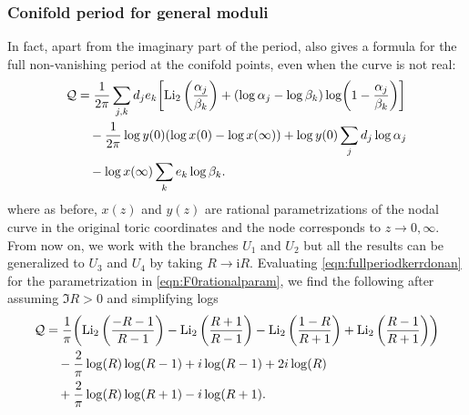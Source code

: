 \documentclass[11pt, a4paper]{article}
\newcommand{\ii}{\mathrm{i}}
\newcommand{\Li}{\operatorname{Li}}
\numberwithin{equation}{section}
\begin{document}
\subsubsection{Conifold period for general moduli}
In fact, apart from the imaginary part of the period, \cite[eq. (4.12)]{kerr2008} also gives a formula for the full non-vanishing period at the conifold points, even when the curve is not real:
\begin{equation}\label{eqn:fullperiodkerrdonan}
\begin{aligned}
  \mathcal{Q} &= \frac{1}{2\pi} \sum_{j, k} d_j e_k \qty[ \Li_2\qty(\frac{\alpha_j}{\beta_k}) + \qty(\log \alpha_j - \log \beta_k) \log(1 - \frac{\alpha_j}{\beta_k}) ] \\
  &\quad -\frac{1}{2\pi} \log y(0) \qty(\log x(0) - \log x(\infty))
  + \log y(0) \sum_j d_j \log \alpha_j \\
  &\quad - \log x(\infty) \sum_k e_k \log \beta_k.
\end{aligned}
\end{equation}
where as before, $x(z)$ and $y(z)$ are rational parametrizations of the nodal curve in the original toric coordinates and the node corresponds to $z \to 0, \infty$.
From now on, we work with the branches $U_1$ and $U_2$ but all the results can be generalized to $U_3$ and $U_4$ by taking $R \to \ii R$.
Evaluating \cref{eqn:fullperiodkerrdonan} for the parametrization in \cref{eqn:F0rationalparam}, we find the following after assuming $\Im R > 0$ and simplifying logs
\begin{equation}
  \begin{aligned}
    \mathcal{Q} &= \frac{1}{\pi} \qty(\Li_2\left(\frac{-R-1}{R-1}\right)-\Li_2\left(\frac{R+1}{R-1}\right)-\Li_2\left(\frac{1-R}{R+1}\right)+\Li_2\left(\frac{R-1}{R+1}\right)) \\
    &\quad -\frac{2}{\pi} \log (R) \log (R-1)+i  \log (R-1)+2 i  \log (R)\\
    &\quad +\frac{2}{\pi} \log (R) \log (R+1)-i  \log (R+1).
    \end{aligned}
\end{equation}
\end{document}
